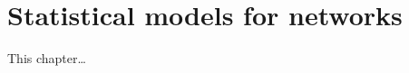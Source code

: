 
\inbpdocument

\chapter{Statistical models for networks}
\label{ch:networks}

This chapter\dots

\outbpdocument{


}
